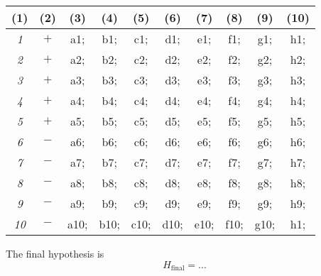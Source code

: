 \documentclass{article}
\begin{document}
\begin{center}
\begin{tabular}{|c|c||c|c|c|c||c|c|c|c|}
          \tiny{(1)} & \tiny{(2)} & \tiny{(3)} & \tiny{(4)} &  \tiny{(5)} & \tiny{(6)} & \tiny{(7)} & \tiny{(8)} & \tiny{(9)} & \tiny{(10)}\\
          \hline \hline
          {\em 1} & $+$ & {\color{red} a1}; & {\color{red} b1}; & {\color{red} c1}; & {\color{red} d1}; & {\color{red} e1}; & {\color{red} f1}; & {\color{red} g1}; & {\color{red} h1};  \\
          \hline
          {\em 2} & $+$ & {\color{red} a2}; & {\color{red} b2}; & {\color{red} c2}; & {\color{red} d2}; & {\color{red} e2}; & {\color{red} f2}; & {\color{red} g2}; & {\color{red} h2};  \\
          \hline
          {\em 3} & $+$ & {\color{red} a3}; & {\color{red} b3}; & {\color{red} c3}; & {\color{red} d3}; & {\color{red} e3}; & {\color{red} f3}; & {\color{red} g3}; & {\color{red} h3}; \\
          \hline
          {\em 4} & $+$ & {\color{red} a4}; & {\color{red} b4}; & {\color{red} c4}; & {\color{red} d4}; & {\color{red} e4}; & {\color{red} f4}; & {\color{red} g4}; & {\color{red} h4}; \\
          \hline
          {\em 5} & $+$ & {\color{red} a5}; & {\color{red} b5}; & {\color{red} c5}; & {\color{red} d5}; & {\color{red} e5}; & {\color{red} f5}; & {\color{red} g5}; & {\color{red} h5}; \\
          \hline
          {\em 6} & $-$ & {\color{red} a6}; & {\color{red} b6}; & {\color{red} c6}; & {\color{red} d6}; & {\color{red} e6}; & {\color{red} f6}; & {\color{red} g6}; & {\color{red} h6}; \\
          \hline
          {\em 7} & $-$ & {\color{red} a7}; & {\color{red} b7}; & {\color{red} c7}; & {\color{red} d7}; & {\color{red} e7}; & {\color{red} f7}; & {\color{red} g7}; & {\color{red} h7}; \\
          \hline
          {\em 8} & $-$ & {\color{red} a8}; & {\color{red} b8}; & {\color{red} c8}; & {\color{red} d8}; & {\color{red} e8}; & {\color{red} f8}; & {\color{red} g8}; & {\color{red} h8}; \\
          \hline
          {\em 9} & $-$ & {\color{red} a9}; & {\color{red} b9}; & {\color{red} c9}; & {\color{red} d9}; & {\color{red} e9}; & {\color{red} f9}; & {\color{red} g9}; & {\color{red} h9}; \\
          \hline
          {\em 10} & $-$ & {\color{red} a10}; & {\color{red} b10}; & {\color{red} c10}; & {\color{red} d10}; & {\color{red} e10}; & {\color{red} f10}; & {\color{red} g10}; & {\color{red} h1}; \\
          \hline
        \end{tabular}
\end{center}
The final hypothesis is
\begin{equation}
    H_\textrm{final} = ...
\end{equation}
\end{document}
